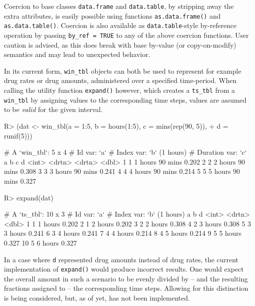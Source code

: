 \documentclass[
  notitle,
  nojss,
  noheadings]{jss}
\begin{document}
Coercion to base classes \texttt{data.frame} and \texttt{data.table}, by
stripping away the extra attributes, is easily possible using functions
\texttt{as.data.frame()} and \texttt{as.data.table()}. Coercion is also
available as \texttt{data.table}-style by-reference operation by passing
\texttt{by\_ref\ =\ TRUE} to any of the above coercion functions. User
caution is advised, as this does break with base  by-value
(or copy-on-modify) semantics and may lead to unexpected behavior.

In its current form, \texttt{win\_tbl} objects can both be used to
represent for example drug rates or drug amounts, administered over a
specified time-period. When calling the utility function
\texttt{expand()} however, which creates a \texttt{ts\_tbl} from a
\texttt{win\_tbl} by assigning values to the corresponding time steps,
values are assumed to be \emph{valid} for the given interval.

\begin{CodeChunk}
\begin{CodeInput}
R> (dat <- win_tbl(a = 1:5, b = hours(1:5), c = mins(rep(90, 5)),
+                 d = runif(5)))
\end{CodeInput}
\begin{CodeOutput}
# A `win_tbl`:  5 x 4
# Id var:       `a`
# Index var:    `b` (1 hours)
# Duration var: `c`
      a b       c           d
  <int> <drtn>  <drtn>  <dbl>
1     1 1 hours 90 mins 0.202
2     2 2 hours 90 mins 0.308
3     3 3 hours 90 mins 0.241
4     4 4 hours 90 mins 0.214
5     5 5 hours 90 mins 0.327
\end{CodeOutput}
\begin{CodeInput}
R> expand(dat)
\end{CodeInput}
\begin{CodeOutput}
# A `ts_tbl`: 10 x 3
# Id var:     `a`
# Index var:  `b` (1 hours)
       a b           d
   <int> <drtn>  <dbl>
 1     1 1 hours 0.202
 2     1 2 hours 0.202
 3     2 2 hours 0.308
 4     2 3 hours 0.308
 5     3 3 hours 0.241
 6     3 4 hours 0.241
 7     4 4 hours 0.214
 8     4 5 hours 0.214
 9     5 5 hours 0.327
10     5 6 hours 0.327
\end{CodeOutput}
\end{CodeChunk}

In a case where \texttt{d} represented drug amounts instead of drug
rates, the current implementation of \texttt{expand()} would produce
incorrect results. One would expect the overall amount in such a
scenario to be evenly divided by -- and the resulting fractions assigned
to -- the corresponding time steps. Allowing for this distinction is
being considered, but, as of yet, has not been implemented.
\end{document}

